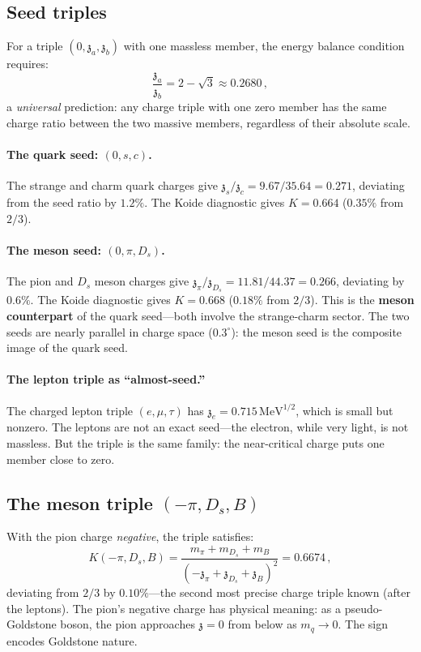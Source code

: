 \documentclass[12pt,a4paper]{article}
\newcommand{\MeV}{\,\mathrm{MeV}}
\newcommand{\zch}{\mathfrak{z}}
\begin{document}
\subsection{Seed triples}

For a triple $(0, \zch_a, \zch_b)$ with one massless member,
the energy balance condition requires:
\begin{equation}
  \frac{\zch_a}{\zch_b} = 2 - \sqrt{3} \approx 0.2680\,,
  \label{eq:seed_ratio}
\end{equation}
a \emph{universal} prediction: any charge triple with one zero
member has the same charge ratio between the two massive members,
regardless of their absolute scale.

\paragraph{The quark seed: $(0, s, c)$.}
The strange and charm quark charges give
$\zch_s / \zch_c = 9.67 / 35.64 = 0.271$,
deviating from the seed ratio by $1.2\%$.
The Koide diagnostic gives $K = 0.664$ ($0.35\%$ from $2/3$).

\paragraph{The meson seed: $(0, \pi, D_s)$.}
The pion and $D_s$ meson charges give
$\zch_\pi / \zch_{D_s} = 11.81 / 44.37 = 0.266$,
deviating by $0.6\%$.
The Koide diagnostic gives $K = 0.668$ ($0.18\%$ from $2/3$).
This is the \textbf{meson counterpart} of the quark seed---both
involve the strange-charm sector.
The two seeds are nearly parallel in charge space ($0.3^\circ$):
the meson seed is the composite image of the quark seed.

\paragraph{The lepton triple as ``almost-seed.''}
The charged lepton triple $(e, \mu, \tau)$ has
$\zch_e = 0.715\MeV^{1/2}$, which is small but nonzero.
The leptons are not an exact seed---the electron, while very
light, is not massless.
But the triple is the same family: the near-critical charge
puts one member close to zero.

\subsection{The meson triple $(-\pi, D_s, B)$}

With the pion charge \emph{negative}, the triple satisfies:
\begin{equation}
  K(-\pi, D_s, B) = \frac{m_\pi + m_{D_s} + m_B}
  {(-\zch_\pi + \zch_{D_s} + \zch_B)^2}
  = 0.6674\,,
  \label{eq:meson_koide}
\end{equation}
deviating from $2/3$ by $0.10\%$---the second most precise
charge triple known (after the leptons).
The pion's negative charge has physical meaning: as a
pseudo-Goldstone boson, the pion approaches $\zch = 0$ from below
as $m_q \to 0$.
The sign encodes Goldstone nature.
\end{document}
